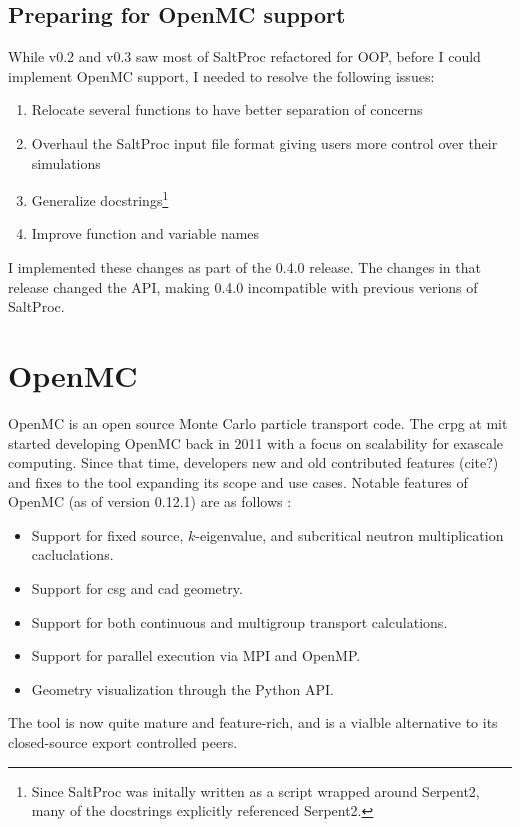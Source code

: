 \subsection{Preparing for OpenMC support}%
\label{sub:refactoring}
While v0.2 and v0.3 saw most of SaltProc refactored for OOP, before I could implement OpenMC support, I needed to resolve the following issues:
\begin{enumerate}
    \item Relocate several functions to have better separation of concerns
    \item Overhaul the SaltProc input file format giving users more control over their simulations
    \item Generalize docstrings\footnote{Since SaltProc was initally written as a script wrapped around Serpent2, many of the docstrings explicitly referenced Serpent2.}
    \item Improve function and variable names
\end{enumerate}
I implemented these changes as part of the 0.4.0 release. The changes in that release changed the API, making 0.4.0 incompatible with previous verions of SaltProc.

\section{OpenMC}%
\label{sec:openmc}

OpenMC \cite{romano_openmc_2015} is an open source Monte Carlo particle transport code. The \Gls{crpg} at \Gls{mit} started developing OpenMC back in 2011 with a focus on scalability for exascale computing. Since that time, developers new and old contributed features (cite?) and fixes to the tool expanding its scope and use cases. Notable features of OpenMC (as of version 0.12.1) are as follows \cite{homepage_openmc_2022}:
\begin{itemize}
    \item Support for fixed source, $k$-eigenvalue, and subcritical neutron multiplication cacluclations.
    \item Support for \Gls{csg} and \Gls{cad} geometry.
    \item Support for both continuous and multigroup transport calculations.
    \item Support for parallel execution via MPI and OpenMP.
    \item Geometry visualization through the Python API.
\end{itemize}
The tool is now quite mature and feature-rich, and is a vialble alternative to its closed-source export controlled peers. 

